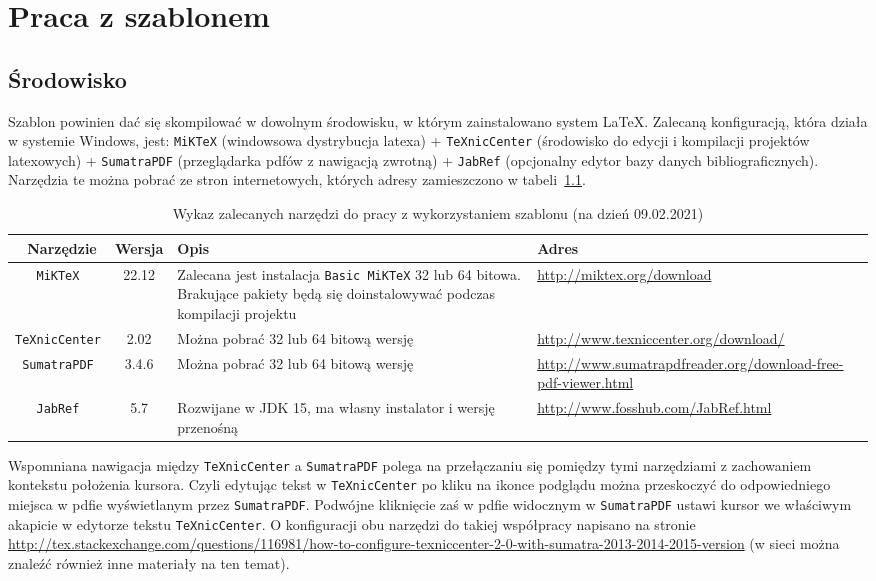 \chapter{Praca z szablonem}
\section{Środowisko}
Szablon powinien dać się skompilować w dowolnym środowisku, w którym zainstalowano system \LaTeX. 
Zalecaną konfiguracją, która działa w systemie Windows, jest: \texttt{MiKTeX} (windowsowa dystrybucja latexa) + \texttt{TeXnicCenter} (środowisko do edycji i kompilacji projektów latexowych) + \texttt{SumatraPDF} (przeglądarka pdfów z nawigacją zwrotną) + \texttt{JabRef} (opcjonalny edytor bazy danych bibliograficznych). Narzędzia te można pobrać ze stron internetowych, których adresy zamieszczono w tabeli~\ref{tab:narzedzia}. 
\begin{table}[htb] \small
\centering
\caption{Wykaz zalecanych narzędzi do pracy z wykorzystaniem szablonu (na dzień 09.02.2021)}
\label{tab:narzedzia}
\begin{tabularx}{\linewidth}{|c|c|X|p{5.5cm}|} \hline\
Narzędzie & Wersja & Opis & Adres \\ \hline\hline
\texttt{MiKTeX} & 22.12 & Zalecana jest instalacja \texttt{Basic MiKTeX} 32 lub 64 bitowa. Brakujące pakiety będą się doinstalowywać podczas kompilacji projektu &
\url{http://miktex.org/download} \\ \hline
\texttt{TeXnicCenter} & 2.02 &  Można pobrać 32 lub 64 bitową wersję & \url{http://www.texniccenter.org/download/} \\ \hline
\texttt{SumatraPDF} & 3.4.6 & Można pobrać 32 lub 64 bitową wersję & \url{http://www.sumatrapdfreader.org/download-free-pdf-viewer.html} \\ \hline
\texttt{JabRef} & 5.7	 & Rozwijane w JDK 15, ma własny instalator i wersję przenośną & \url{http://www.fosshub.com/JabRef.html} \\ \hline
\end{tabularx}
\end{table}

Wspomniana nawigacja między \texttt{TeXnicCenter} a \texttt{SumatraPDF} polega na przełączaniu się pomiędzy tymi narzędziami z zachowaniem kontekstu położenia kursora. Czyli edytując tekst w \texttt{TeXnicCenter} po kliku na ikonce podglądu można przeskoczyć do odpowiedniego miejsca w pdfie wyświetlanym przez \texttt{SumatraPDF}. Podwójne kliknięcie zaś w pdfie widocznym w \texttt{SumatraPDF} ustawi kursor we właściwym akapicie w edytorze tekstu \texttt{TeXnicCenter}. O konfiguracji obu narzędzi do takiej współpracy napisano na stronie \url{http://tex.stackexchange.com/questions/116981/how-to-configure-texniccenter-2-0-with-sumatra-2013-2014-2015-version} (w sieci można znaleźć również inne materiały na ten temat).

